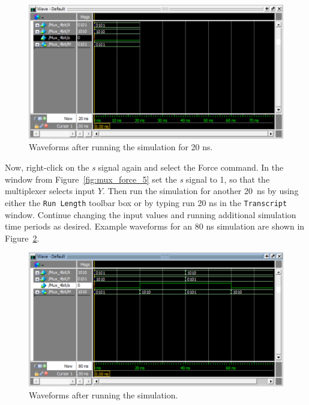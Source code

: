\documentclass[11pt, twoside, pdftex]{article}
\begin{document}
\begin{figure}[H]
   \begin{center}
      \includegraphics[scale=.75]{figures/mux_20ns.png}
       \caption{Waveforms after running the simulation for 20 ns.} 
	 \label{fig:mux_20ns}
	 \end{center}
\end{figure}

Now, right-click on the {\it s} signal again and select the {\sf Force} command. In the window 
from Figure~\ref{fig:mux_force_5} set the {\it s} signal to 1, so that the multiplexer
selects input $Y$.
Then run the simulation for another 20~ns by using either the \texttt{Run Length} toolbar box
or by typing {\sf run 20 ns} in the \texttt{Transcript} window. Continue changing the
input values and running additional simulation time periods as desired. Example waveforms for
an 80 ns simulation are shown in Figure~\ref{fig:mux_80ns}.

\begin{figure}[H]
   \begin{center}
      \includegraphics[scale=.75]{figures/mux_80ns.png}
       \caption{Waveforms after running the simulation.} 
	 \label{fig:mux_80ns}
	 \end{center}
\end{figure}
\end{document}

